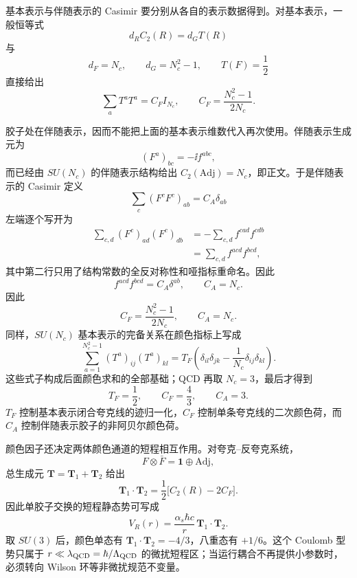 基本表示与伴随表示的 Casimir 要分别从各自的表示数据得到。对基本表示，一般恒等式
\[
 d_R C_2(R)=d_G T(R)
\]
与
\[
 d_F=N_c,\qquad d_G=N_c^2-1,\qquad T(F)=\frac12
\]
直接给出
\begin{equation}
 \sum_aT^aT^a=C_FI_{N_c},
 \qquad
 C_F=\frac{N_c^2-1}{2N_c}.
 \label{eq:CF-definition-dp10}
\end{equation}

胶子处在伴随表示，因而不能把上面的基本表示维数代入再次使用。伴随表示生成元为
\[
 (F^a)_{bc}=-\ii f^{abc},
\]
而已经由 $SU(N_c)$ 的伴随表示结构给出
$C_2(\mathrm{Adj})=N_c$，即正文。于是伴随表示的 Casimir 定义
\[
 \sum_c(F^cF^c)_{ab}=C_A\delta_{ab}
\]
左端逐个写开为
\begin{align*}
 \sum_{c,d}(F^c)_{ad}(F^c)_{db}
 &=-\sum_{c,d}f^{cad}f^{cdb}\\
 &=\sum_{c,d}f^{acd}f^{bcd},
\end{align*}
其中第二行只用了结构常数的全反对称性和哑指标重命名。因此
\begin{equation}
 f^{acd}f^{bcd}=C_A\delta^{ab},
 \qquad C_A=N_c.
 \label{eq:CA-definition-dp10}
\end{equation}
因此
\begin{equation}
 {
 C_F=\frac{N_c^2-1}{2N_c},
 \qquad C_A=N_c.}
 \label{eq:SUN-CF-CA-dp32}
\end{equation}
同样，$SU(N_c)$ 基本表示的完备关系在颜色指标上写成
\begin{equation}
 {
 \sum_{a=1}^{N_c^2-1}(T^a)_{ij}(T^a)_{kl}
 =T_F\left(\delta_{il}\delta_{jk}-\frac1{N_c}\delta_{ij}\delta_{kl}\right).}
 \label{eq:SUN-fierz-dp10}
\end{equation}
这些式子构成后面颜色求和的全部基础；QCD 再取 $N_c=3$，最后才得到
\[
T_F=\frac12,\qquad C_F=\frac43,\qquad C_A=3.
\]
$T_F$ 控制基本表示闭合夸克线的迹归一化，$C_F$ 控制单条夸克线的二次颜色荷，而 $C_A$ 控制伴随表示胶子的非阿贝尔颜色荷。

颜色因子还决定两体颜色通道的短程相互作用。对夸克--反夸克系统，
\begin{equation*}
 F\otimes\bar F=\mathbf1\oplus\mathrm{Adj},
\end{equation*}
总生成元 $\mathbf T=\mathbf T_1+\mathbf T_2$ 给出
\begin{equation}
 \mathbf T_1\!\cdot\!\mathbf T_2
 =\frac12\bigl[C_2(R)-2C_F\bigr].
 \label{eq:qcd-two-body-color-casimir-dp73}
\end{equation}
因此单胶子交换的短程静态势可写成
\begin{equation*}
 V_R(r)=\frac{\alpha_s\hbar c}{r}\,
 \mathbf T_1\!\cdot\!\mathbf T_2.
\end{equation*}
取 $SU(3)$ 后，颜色单态有 $\mathbf T_1\!\cdot\!\mathbf T_2=-4/3$，八重态有 $+1/6$。这个 Coulomb 型势只属于 $r\ll\lambda_{\rm QCD}=\hbar/\Lambda_{\rm QCD}$ 的微扰短程区；当运行耦合不再提供小参数时，必须转向 Wilson 环等非微扰规范不变量。

